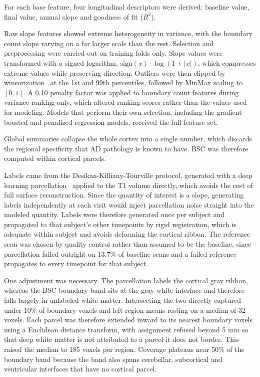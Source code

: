 \documentclass[blue]{ludusofficial}  %
\begin{document}
For each base feature, four longitudinal descriptors were derived: baseline value, final value, annual slope and goodness of fit ($R^2$).

Raw slope features showed extreme heterogeneity in variance, with the boundary count slope varying on a far larger scale than the rest. Selection and preprocessing were carried out on training folds only. Slope values were transformed with a signed logarithm, $\text{sign}(x) \cdot \log(1 + |x|)$, which compresses extreme values while preserving direction. Outliers were then clipped by winsorization~\cite{tukey1962future} at the 1st and 99th percentiles, followed by MinMax scaling to $[0, 1]$. A 0.10 penalty factor was applied to boundary count features during variance ranking only, which altered ranking scores rather than the values used for modeling. Models that perform their own selection, including the gradient-boosted and penalized regression models, received the full feature set.

Global summaries collapse the whole cortex into a single number, which discards the regional specificity that AD pathology is known to have. BSC was therefore computed within cortical parcels.

Labels came from the Desikan-Killiany-Tourville protocol, generated with a deep learning parcellation~\cite{tustison2021antsxnet} applied to the T1 volume directly, which avoids the cost of full surface reconstruction. Since the quantity of interest is a slope, generating labels independently at each visit would inject parcellation noise straight into the modeled quantity. Labels were therefore generated once per subject and propagated to that subject's other timepoints by rigid registration, which is adequate within subject and avoids deforming the cortical ribbon. The reference scan was chosen by quality control rather than assumed to be the baseline, since parcellation failed outright on 13.7\% of baseline scans and a failed reference propagates to every timepoint for that subject.

One adjustment was necessary. The parcellation labels the cortical gray ribbon, whereas the BSC boundary band sits at the gray-white interface and therefore falls largely in unlabeled white matter. Intersecting the two directly captured under 10\% of boundary voxels and left region means resting on a median of 32 voxels. Each parcel was therefore extended inward to its nearest boundary voxels using a Euclidean distance transform, with assignment refused beyond 5 mm so that deep white matter is not attributed to a parcel it does not border. This raised the median to 185 voxels per region. Coverage plateaus near 50\% of the boundary band because the band also spans cerebellar, subcortical and ventricular interfaces that have no cortical parcel.
\end{document}
